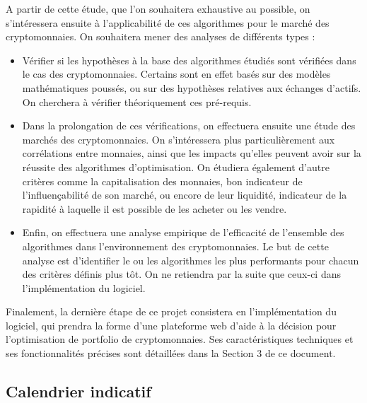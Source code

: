 \documentclass[a4paper]{article}
\begin{document}
A partir de cette étude, que l'on souhaitera exhaustive au possible, on s'intéressera ensuite à l'applicabilité de ces algorithmes pour le marché des cryptomonnaies. On souhaitera mener des analyses de différents types :
\begin{itemize}
    \item Vérifier si les hypothèses à la base des algorithmes étudiés sont vérifiées dans le cas des cryptomonnaies. Certains sont en effet basés sur des modèles mathématiques poussés, ou sur des hypothèses relatives aux échanges d'actifs. On cherchera à vérifier théoriquement ces pré-requis.
    \item Dans la prolongation de ces vérifications, on effectuera ensuite une étude des marchés des cryptomonnaies. On s'intéressera plus particulièrement aux corrélations entre monnaies, ainsi que les impacts qu'elles peuvent avoir sur la réussite des algorithmes d'optimisation. On étudiera également d'autre critères comme la capitalisation des monnaies, bon indicateur de l'influençabilité de son marché, ou encore de leur liquidité, indicateur de la rapidité à laquelle il est possible de les acheter ou les vendre.
    \item Enfin, on effectuera une analyse empirique de l'efficacité de l'ensemble des algorithmes dans l'environnement des cryptomonnaies. Le but de cette analyse est d'identifier le ou les algorithmes les plus performants pour chacun des critères définis plus tôt. On ne retiendra par la suite que ceux-ci dans l'implémentation du logiciel.
\end{itemize}\medskip

Finalement, la dernière étape de ce projet consistera en l'implémentation du logiciel, qui prendra la forme d’une plateforme web d’aide à la décision pour l’optimisation de portfolio de cryptomonnaies. Ses caractéristiques techniques et ses fonctionnalités précises sont détaillées dans la Section 3 de ce document.

\subsection{Calendrier indicatif}
\end{document}
